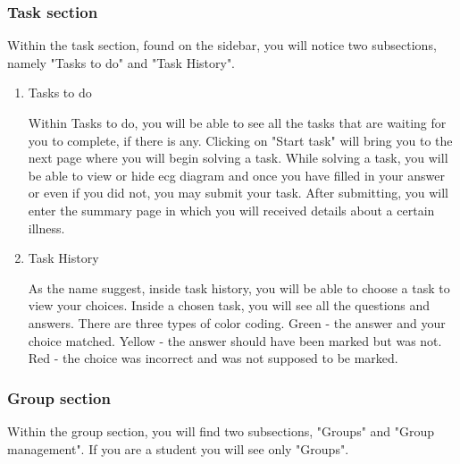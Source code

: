\documentclass[singlespacing,12pt,parskip,headsepline,consistentlayout]{article}
\begin{document}
\subsubsection{Task section}

Within the task section, found on the sidebar, you will notice two subsections, namely "Tasks to do" and "Task History".

\begin{enumerate}
    \item Tasks to do

    Within Tasks to do, you will be able to see all the tasks that are waiting for you to complete, if there is any. Clicking on "Start task" will bring you to the next page where you will begin solving a task. While solving a task, you will be able to view or hide ecg diagram and once you have filled in your answer or even if you did not, you may submit your task. After submitting, you will enter the summary page in which you will received details about a certain illness.

    \item Task History

    As the name suggest, inside task history, you will be able to choose a task to view your choices. Inside a chosen task, you will see all the questions and answers. There are three types of color coding. Green - the answer and your choice matched. Yellow - the answer should have been marked but was not. Red - the choice was incorrect and was not supposed to be marked.
    
\end{enumerate}

\subsubsection{Group section}
Within the group section, you will find two subsections, "Groups" and "Group management". If you are a student you will see only "Groups".
\end{document}

